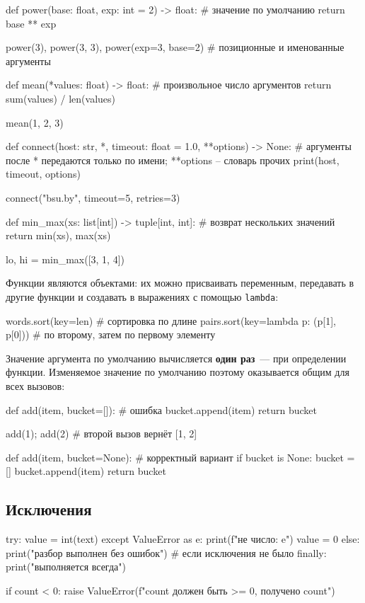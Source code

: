 \documentclass[11pt,a4paper]{article}
\newcommand{\code}[1]{\texttt{#1}}
\begin{document}
\begin{py}
def power(base: float, exp: int = 2) -> float:      # значение по умолчанию
    return base ** exp

power(3), power(3, 3), power(exp=3, base=2)         # позиционные и именованные аргументы

def mean(*values: float) -> float:                  # произвольное число аргументов
    return sum(values) / len(values)

mean(1, 2, 3)

def connect(host: str, *, timeout: float = 1.0, **options) -> None:
    # аргументы после * передаются только по имени; **options -- словарь прочих
    print(host, timeout, options)

connect("bsu.by", timeout=5, retries=3)

def min_max(xs: list[int]) -> tuple[int, int]:      # возврат нескольких значений
    return min(xs), max(xs)

lo, hi = min_max([3, 1, 4])
\end{py}

Функции являются объектами: их можно присваивать переменным, передавать в другие функции
и создавать в выражениях с помощью \code{lambda}:
\begin{py}
words.sort(key=len)                         # сортировка по длине
pairs.sort(key=lambda p: (p[1], p[0]))      # по второму, затем по первому элементу
\end{py}

Значение аргумента по умолчанию вычисляется \textbf{один раз}~— при определении функции.
Изменяемое значение по умолчанию поэтому оказывается общим для всех вызовов:
\begin{py}
def add(item, bucket=[]):       # ошибка
    bucket.append(item)
    return bucket

add(1); add(2)                  # второй вызов вернёт [1, 2]

def add(item, bucket=None):     # корректный вариант
    if bucket is None:
        bucket = []
    bucket.append(item)
    return bucket
\end{py}

\subsection{Исключения}

\begin{py}
try:
    value = int(text)
except ValueError as e:
    print(f"не число: {e}")
    value = 0
else:
    print("разбор выполнен без ошибок")   # если исключения не было
finally:
    print("выполняется всегда")

if count < 0:
    raise ValueError(f"count должен быть >= 0, получено {count}")
\end{py}
\end{document}
